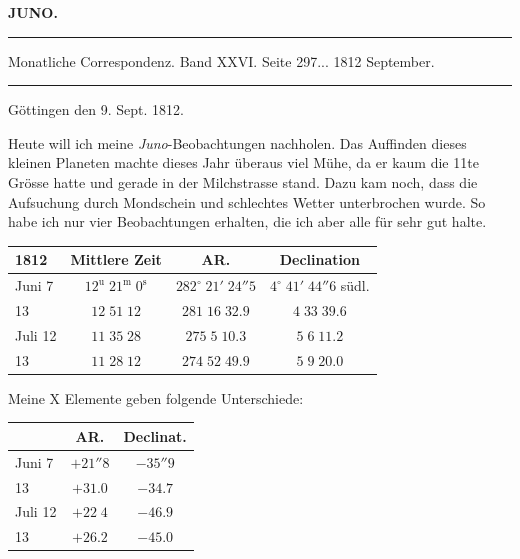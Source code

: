 \clearpage{}\hypertarget{native-365-lower}{}\label{native-365-lower}
\begin{center}\textbf{JUNO.}\par\vspace{4pt}\hrule\vspace{4pt}\fontsize{10}{12}\selectfont Monatliche Correspondenz. Band XXVI. Seite 297\;... 1812 September.\par\vspace{4pt}\hrule\vspace{4pt}\end{center}

\begin{flushright}Göttingen den 9. Sept. 1812.\end{flushright}
\par\indent Heute will ich meine \emph{Juno}-Beobachtungen nachholen. Das Auffinden
dieses kleinen Planeten machte dieses Jahr überaus viel Mühe, da er
kaum die 11te Grösse hatte und gerade in der Milchstrasse stand. Dazu kam
noch, dass die Aufsuchung durch Mondschein und schlechtes Wetter
unterbrochen wurde. So habe ich nur vier Beobachtungen erhalten, die ich
aber alle für sehr gut halte.

\begin{center}\fontsize{10}{12}\selectfont\setlength{\tabcolsep}{4pt}\renewcommand{\arraystretch}{1.15}\begin{tabular}{l|c|c|c}
1812 & Mittlere Zeit & AR. & Declination\\\hline
Juni 7 & $12^{\mathrm u}\;21^{\mathrm m}\;0^{\mathrm s}$ & $282^\circ\;21'\;24''5$ & $4^\circ\;41'\;44''6$ südl.\\
13 & $12\;51\;12$ & $281\;16\;32.9$ & $4\;33\;39.6$\\
Juli 12 & $11\;35\;28$ & $275\;5\;10.3$ & $5\;6\;11.2$\\
13 & $11\;28\;12$ & $274\;52\;49.9$ & $5\;9\;20.0$\\
\end{tabular}\end{center}

\par\indent Meine X Elemente geben folgende Unterschiede:

\begin{center}\fontsize{10}{12}\selectfont\setlength{\tabcolsep}{7pt}\renewcommand{\arraystretch}{1.15}\begin{tabular}{l|c|c}
& AR. & Declinat.\\\hline
Juni 7 & $+21''8$ & $-35''9$\\
13 & $+31.0$ & $-34.7$\\
Juli 12 & $+22\;4$ & $-46.9$\\
13 & $+26.2$ & $-45.0$\\
\end{tabular}\end{center}

